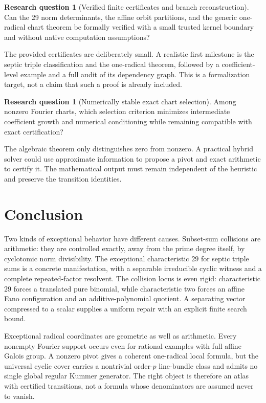 \documentclass[11pt,a4paper]{article}
\theoremstyle{definition}
\newtheorem{question}[theorem]{Research question}
\theoremstyle{remark}
\begin{document}
\begin{question}[Verified finite certificates and branch reconstruction]
Can the 29 norm determinants, the affine orbit partitions, and the generic
one-radical chart theorem be formally verified with a small trusted kernel
boundary and without native computation assumptions?
\end{question}
The provided certificates are deliberately small. A realistic first
milestone is the septic triple classification and the one-radical theorem,
followed by a coefficient-level example and a full audit of its dependency
graph. This is a formalization target, not a claim that such a proof is
already included.

\begin{question}[Numerically stable exact chart selection]
Among nonzero Fourier charts, which selection criterion minimizes
intermediate coefficient growth and numerical conditioning while remaining
compatible with exact certification?
\end{question}
The algebraic theorem only distinguishes zero from nonzero. A practical
hybrid solver could use approximate information to propose a pivot and
exact arithmetic to certify it. The mathematical output must remain
independent of the heuristic and preserve the transition identities.

\section{Conclusion}

Two kinds of exceptional behavior have different causes. Subset-sum
collisions are arithmetic: they are controlled exactly, away from the
prime degree itself, by cyclotomic norm divisibility. The exceptional
characteristic $29$ for septic triple sums is a concrete manifestation,
with a separable irreducible cyclic witness and a complete repeated-factor
resolvent. The collision locus is even rigid: characteristic $29$ forces
a translated pure binomial, while characteristic two forces an affine
Fano configuration and an additive-polynomial quotient. A separating
vector compressed to a scalar supplies a uniform
repair with an explicit finite search bound.

Exceptional radical coordinates are geometric as well as arithmetic.
Every nonempty Fourier support occurs even for rational examples with full
affine Galois group. A nonzero pivot gives a coherent one-radical local
formula, but the universal cyclic cover carries a nontrivial order-$p$
line-bundle class and admits no single global regular Kummer generator.
The right object is therefore an atlas with certified transitions, not a
formula whose denominators are assumed never to vanish.
\end{document}
